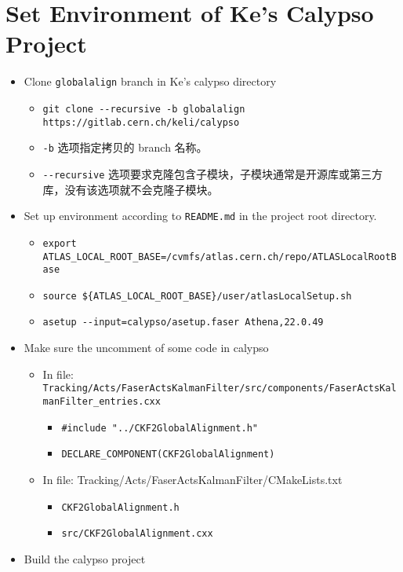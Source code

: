\section{Set Environment of Ke's Calypso Project}
\begin{itemize}
	\item Clone \verb|globalalign| branch in Ke's calypso directory
	\begin{itemize}
		\item \verb|git clone --recursive -b globalalign https://gitlab.cern.ch/keli/calypso|
		\item \verb|-b| 选项指定拷贝的 branch 名称。
		\item \verb|--recursive| 选项要求克隆包含子模块，子模块通常是开源库或第三方库，没有该选项就不会克隆子模块。
	\end{itemize}
	\item Set up environment according to \verb|README.md| in the project root directory.
	\begin{itemize}
		\item \verb|export ATLAS_LOCAL_ROOT_BASE=/cvmfs/atlas.cern.ch/repo/ATLASLocalRootBase|
		\item \verb|source ${ATLAS_LOCAL_ROOT_BASE}/user/atlasLocalSetup.sh|
		\item \verb|asetup --input=calypso/asetup.faser Athena,22.0.49|
	\end{itemize}
	\item Make sure the uncomment of some code in calypso
	\begin{itemize}
		\item In file: \verb|Tracking/Acts/FaserActsKalmanFilter/src/components/FaserActsKalmanFilter_entries.cxx|
		\begin{itemize}
			\item \verb|#include "../CKF2GlobalAlignment.h"|
			\item \verb|DECLARE_COMPONENT(CKF2GlobalAlignment)|
		\end{itemize}
		\item In file: Tracking/Acts/FaserActsKalmanFilter/CMakeLists.txt
		\begin{itemize}
			\item \verb|CKF2GlobalAlignment.h|
			\item \verb|src/CKF2GlobalAlignment.cxx|
		\end{itemize}
	\end{itemize}
	\item Build the calypso project
	\begin{itemize}

\end{itemize}
\end{itemize}
